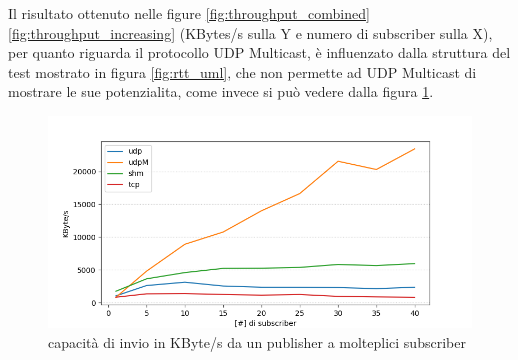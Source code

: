 Il risultato ottenuto nelle figure \ref{fig:throughput_combined} \ref{fig:throughput_increasing} (KBytes/s sulla Y e numero di subscriber sulla X), per quanto riguarda il protocollo UDP Multicast, è influenzato dalla struttura del test mostrato in figura \ref{fig:rtt_uml}, che non permette ad UDP Multicast di mostrare le sue potenzialita, come invece si può vedere dalla figura \ref{fig:bandwidth_graph}.

\begin{figure}[H]
    \includegraphics[width=\textwidth]{./results/test3_graph_bandwidth.png} 
        \caption{capacità di invio in KByte/s da un publisher a molteplici subscriber}\label{fig:bandwidth_graph}
\end{figure}


